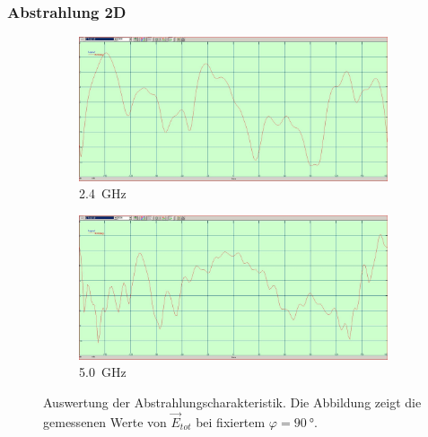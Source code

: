 \subsubsection{Abstrahlung 2D}
\begin{figure}[h!]
	\begin{center}
		\begin{subfigure}[t]{0.49\textwidth}
			\includegraphics[width=1\textwidth]{../fig/plt/2G4_90phi_etot_dB.JPG}
			\caption{\SI{2.4}{\giga\hertz}}
		\end{subfigure}
		\begin{subfigure}[t]{0.49\textwidth}
			\includegraphics[width=1\textwidth]{../fig/plt/5G0_90phi_etot_dB.JPG}
			\caption{\SI{5.0}{\giga\hertz}}
		\end{subfigure}
		\caption[Auswertung der Abstrahlungscharakteristik]{
			Auswertung der Abstrahlungscharakteristik.
			Die Abbildung zeigt die gemessenen Werte von $\vec{E}_{tot}$
			bei fixiertem $\varphi = \SI{90}{\degree}$.}
		\label{fig:starlab_etot_curve}
	\end{center}
\end{figure}

